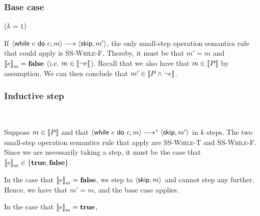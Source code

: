 \documentclass[10pt]{article}
\theoremstyle{definition}
\begin{document}
\subsubsection*{Base case} ($k = 1$)

\noindent
If $\Cfg(\While e do c, m) \sstepsto \Cfg(\Skip, m')$, the only small-step operation semantics rule 
that could apply is \textsc{SS-While-F}.
Thereby, it must be that $m' = m$ and $\Eval(e, m) = \False$ (i.e. $m \in \left\llbracket \neg e \right\rrbracket$).
Recall that we also have that $m \in \left\llbracket P \right\rrbracket$ by assumption.
We can then conclude that $m' \in \left\llbracket P \wedge \neg e \right\rrbracket$.

\subsubsection*{Inductive step}\

\noindent
Suppose $m \in \left\llbracket P \right\rrbracket$ and that $\Cfg(\While e do c, m) \sstepstotrans \Cfg(\Skip, m')$ in $k$ steps.
The two small-step operation semantics rule that apply are \textsc{SS-While-T} and \textsc{SS-While-F}.
Since we are necessarily taking a step, it must be the case that $\Eval(e, m) \in \{\True, \False\}$.

In the case that $\Eval(e, m) = \False$, we step to $\Cfg(\Skip, m)$ and cannot step any further.
Hence, we have that $m' = m$, and the base case applies.

In the case that $\Eval(e, m) = \True$, 





\newpage

\end{document}
